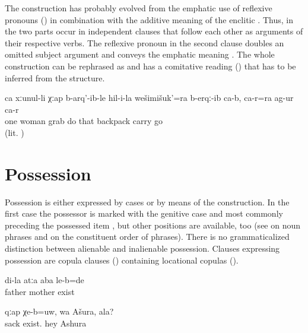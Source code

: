 The construction has probably evolved from the emphatic use of reflexive pronouns () in combination with the additive meaning of the enclitic . Thus, in  the two parts occur in independent clauses that follow each other as arguments of their respective verbs. The reflexive pronoun in the second clause doubles an omitted subject argument and conveys the emphatic meaning . The whole construction can be rephrased as  and has a comitative reading () that has to be inferred from the structure.
%
\begin{exe}
	\ex	\label{ex:There one woman grabbed his backpack, took it, and went away with it}
	\gll	ca	xːunul-li	χːap	b-arq'-ib-le	hil-i-la	wešimišuk'=ra b-erqː-ib	ca-b,	ca-r=ra	ag-ur	ca-r\\
		one	woman	grab	do	that	backpack carry			go	\\
	\glt	{} (lit. )
\end{exe}



\section{Possession}
\label{sec:Possession}

Possession is either expressed by cases or by means of the  construction. In the first case the possessor is marked with the genitive case and most commonly preceding the possessed item , but other positions are available, too  (see  on noun phrases and  on the constituent order of phrases). There is no grammaticalized distinction between alienable and inalienable possession. Clauses expressing possession are copula clauses () containing locational copulas ().
%
\begin{exe}
	\ex	\label{ex:I had mother and father}
	\gll	di-la	atːa	aba	le-b=de\\
			father	mother	exist\\
	\glt	{}

	\ex	\label{ex:‎Is your sack there, Ashura}
	\gll	qːap	χe-b=uw,	wa	Ašura,		ala?\\
		sack	exist.	hey	Ashura		\\
	\glt	{}
\end{exe}

